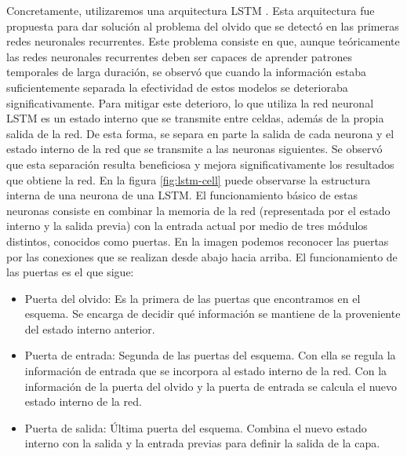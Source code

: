 \documentclass[../main.tex]{memoir}
\begin{document}
Concretamente, utilizaremos una arquitectura LSTM
\cite{hochreiter1997long}. Esta arquitectura fue propuesta para dar
solución al problema del olvido que se detectó en las primeras redes
neuronales recurrentes. Este problema consiste en que, aunque
teóricamente las redes neuronales recurrentes deben ser capaces de
aprender patrones temporales de larga duración, se observó que cuando
la información estaba suficientemente separada la efectividad de estos
modelos se deterioraba significativamente. Para mitigar este
deterioro, lo que utiliza la red neuronal LSTM es un estado interno
que se transmite entre celdas, además de la propia salida de la red.
De esta forma, se separa en parte la salida de cada neurona y el
estado interno de la red que se transmite a las neuronas
siguientes. Se observó que esta separación resulta beneficiosa y
mejora significativamente los resultados que obtiene la red. En la
figura \ref{fig:lstm-cell} puede observarse la estructura interna de
una neurona de una LSTM. El funcionamiento básico de estas neuronas
consiste en combinar la memoria de la red (representada por el estado
interno y la salida previa) con la entrada actual por medio de tres
módulos distintos, conocidos como puertas. En la imagen podemos
reconocer las puertas por las conexiones que se realizan desde abajo
hacia arriba. El funcionamiento de las puertas es el que sigue:

\begin{itemize}
\item Puerta del olvido: Es la primera de las puertas que encontramos
  en el esquema. Se encarga de decidir qué información se mantiene
  de la proveniente del estado interno anterior.
\item Puerta de entrada: Segunda de las puertas del esquema. Con ella
  se regula la información de entrada que se incorpora al estado
  interno de la red. Con la información de la puerta del olvido y la
  puerta de entrada se calcula el nuevo estado interno de la red.
\item Puerta de salida: Última puerta del esquema. Combina el nuevo
  estado interno con la salida y la entrada previas para definir la
  salida de la capa.
\end{itemize}
\end{document}
